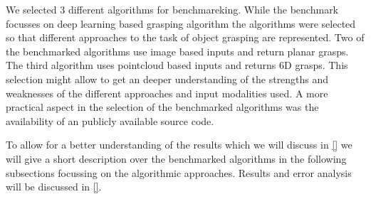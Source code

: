 We selected 3 different algorithms for benchmareking.
While the benchmark focusses on deep learning based grasping algorithm the algorithms were selected so that different approaches to the task of object grasping
are represented.
Two of the benchmarked algorithms use image based inputs and return planar grasps.
The third algorithm uses pointcloud based inputs and returns 6D grasps.
This selection might allow to get an deeper understanding of the strengths and weaknesses of the different approaches and input modalities used.
A more practical aspect in the selection of the benchmarked algorithms was the availability of an publicly available source code.

To allow for a better understanding of the results which we will discuss in \ref{} we will give a short description over the benchmarked
algorithms in the following subsections focussing on the algorithmic approaches.
Results and error analysis will be discussed in \ref{}.


